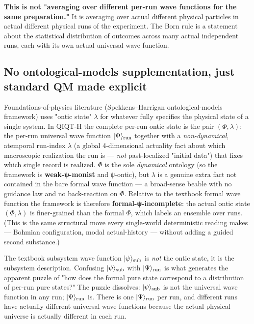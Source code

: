\documentclass[11pt,a4paper]{article}
\begin{document}
\textbf{This is not "averaging over different per-run wave functions for the same preparation."} It is averaging over actual different physical particles in actual different physical runs of the experiment. The Born rule is a statement about the statistical distribution of outcomes across many actual independent runs, each with its own actual universal wave function.

\subsection{No ontological-models supplementation, just standard QM made explicit}

Foundations-of-physics literature (Spekkens–Harrigan ontological-models framework) uses "ontic state" $\lambda$ for whatever fully specifies the physical state of a single system. In QIQT-H the complete per-run ontic state is the pair $(\Phi, \lambda)$: the per-run universal wave function $|\Psi\rangle_{\rm run}$ together with a \emph{non-dynamical}, atemporal run-index $\lambda$ (a global 4-dimensional actuality fact about which macroscopic realization the run is — \emph{not} past-localized "initial data") that fixes which single record is realized. $\Phi$ is the sole \emph{dynamical} ontology (so the framework is \textbf{weak-ψ-monist} and ψ-ontic), but $\lambda$ is a genuine extra fact not contained in the bare formal wave function — a broad-sense beable with no guidance law and no back-reaction on $\Phi$. Relative to the textbook formal wave function the framework is therefore \textbf{formal-ψ-incomplete}: the actual ontic state $(\Phi, \lambda)$ is finer-grained than the formal $\Phi$, which labels an ensemble over runs. (This is the same structural move every single-world deterministic reading makes — Bohmian configuration, modal actual-history — without adding a guided second substance.)

The textbook subsystem wave function $|\psi\rangle_{\rm sub}$ is \emph{not} the ontic state, it is the subsystem description. Confusing $|\psi\rangle_{\rm sub}$ with $|\Psi\rangle_{\rm run}$ is what generates the apparent puzzle of "how does the formal pure state correspond to a distribution of per-run pure states?" The puzzle dissolves: $|\psi\rangle_{\rm sub}$ is not the universal wave function in any run; $|\Psi\rangle_{\rm run}$ is. There is one $|\Psi\rangle_{\rm run}$ per run, and different runs have actually different universal wave functions because the actual physical universe is actually different in each run.
\end{document}
